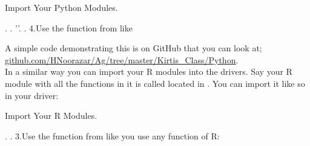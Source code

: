 \begin{tcolorbox}
  \begin{algorithm}[H]
  \label{alg:importPythonCode}
   \caption{Import Your Python Modules.}
.  . ''\code{)}.     .     \;
4.Use the function  from  like \\
\end{algorithm}
\end{tcolorbox}
A simple code demonstrating this is on GitHub that you can look at;
\href{https://github.com/HNoorazar/Ag/tree/master/Kirtis\_Class/Python}{github.com/HNoorazar/Ag/tree/master/Kirtis\_Class/Python}.\\

In a similar way you can import your R modules into the drivers.
Say your R module with all the functions in it is called 
located in .
You can import it like so in your driver:

\begin{tcolorbox}
  \begin{algorithm}[H]
  \label{alg:importRCode}
   \caption{Import Your R Modules.}
.   .  \;
3.Use the function  from  like you use any function of R: \\
\end{algorithm}
\end{tcolorbox}








